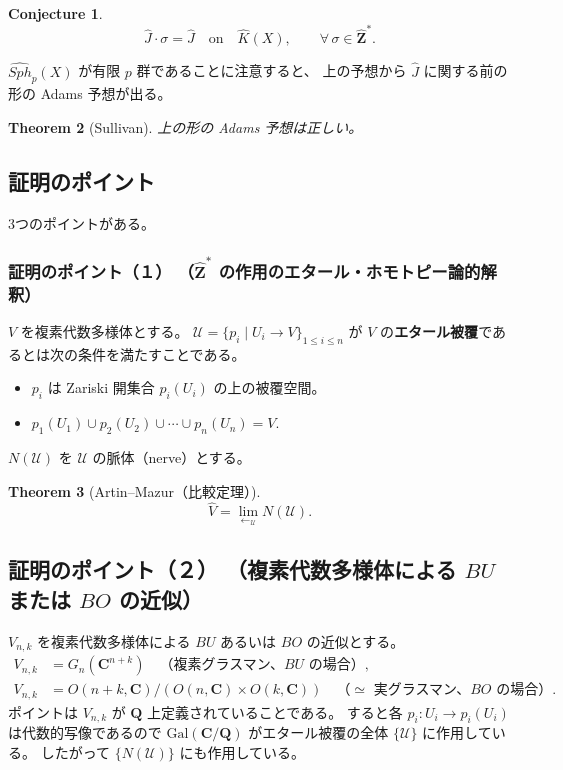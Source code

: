 \documentclass[uplatex,dvipdfmx,a4paper,12pt]{jlreq}
\newtheorem{theorem}{Theorem}
\newtheorem{conjecture}[theorem]{Conjecture}
\newcommand{\Z}{\mathbf{Z}}
\newcommand{\C}{\mathbf{C}}
\newcommand{\Q}{\mathbf{Q}}
\begin{document}
\begin{conjecture}
  \[
    \hat{J} \cdot \sigma = \hat{J}
    \quad \text{on} \quad \hat{K}(X),
    \qquad \forall\, \sigma \in \hat{\Z}^*.
  \]
\end{conjecture}

$\widehat{\mathit{Sph}}_p(X)$ が有限 $p$ 群であることに注意すると、
上の予想から $\hat{J}$ に関する前の形の Adams 予想が出る。

\begin{theorem}[Sullivan]
  上の形の Adams 予想は正しい。
\end{theorem}

\subsection{証明のポイント}

3つのポイントがある。

\subsubsection{証明のポイント（１）
（$\hat{\Z}^*$ の作用のエタール・ホモトピー論的解釈）}

$V$ を複素代数多様体とする。
$\mathcal{U} = \{p_i \mid U_i \to V\}_{1 \leq i \leq n}$ が
$V$ の\textbf{エタール被覆}であるとは次の条件を満たすことである。
\begin{itemize}
  \item $p_i$ は Zariski 開集合 $p_i(U_i)$ の上の被覆空間。
  \item $p_1(U_1) \cup p_2(U_2) \cup \cdots \cup p_n(U_n) = V$.
\end{itemize}

$N(\mathcal{U})$ を $\mathcal{U}$ の脈体（nerve）とする。

\begin{theorem}[Artin--Mazur（比較定理）]
  \[
    \hat{V} = \lim_{\longleftarrow_{\mathcal{U}}} N(\mathcal{U}).
  \]
\end{theorem}

\subsection{証明のポイント（２）
（複素代数多様体による $BU$ または $BO$ の近似）}

$V_{n,k}$ を複素代数多様体による $BU$ あるいは $BO$ の近似とする。
\begin{align*}
  V_{n,k} &= G_n(\C^{n+k})
           \quad \text{（複素グラスマン、$BU$ の場合）}, \\
  V_{n,k} &= O(n+k, \C) / (O(n, \C) \times O(k, \C))
           \quad \text{（$\simeq$ 実グラスマン、$BO$ の場合）}.
\end{align*}
ポイントは $V_{n,k}$ が $\Q$ 上定義されていることである。
すると各 $p_i : U_i \to p_i(U_i)$ は代数的写像であるので
$\mathrm{Gal}(\C/\Q)$ がエタール被覆の全体 $\{\mathcal{U}\}$ に作用している。
したがって $\{N(\mathcal{U})\}$ にも作用している。
\end{document}
